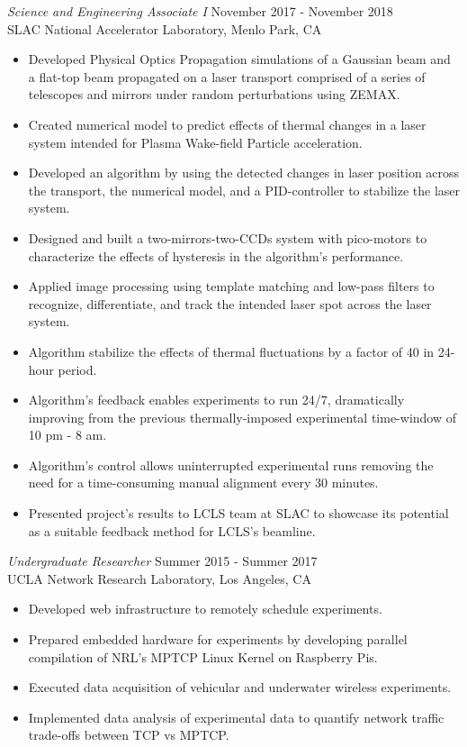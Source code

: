 \documentclass[margin,line]{res}
\begin{document}
\begin{resume}
{\sl Science and Engineering Associate I} \hfill November 2017 - November 2018 \\
				SLAC National Accelerator Laboratory, Menlo Park, CA
				\begin{itemize}
					\itemsep -2pt
					\item Developed Physical Optics Propagation simulations of a Gaussian beam and a flat-top beam propagated on a laser transport comprised of a series of telescopes and mirrors under random perturbations using ZEMAX. 
					\item Created numerical model to predict effects of thermal changes in a laser system intended for Plasma Wake-field Particle acceleration.  
					\item Developed an algorithm by using the detected changes in laser position across the transport, the numerical model, and a PID-controller to stabilize the laser system. 
					\item Designed and built a two-mirrors-two-CCDs system with pico-motors to characterize the effects of hysteresis in the algorithm's performance.
					\item Applied image processing using template matching and low-pass filters to recognize, differentiate, and track the intended laser spot across the laser system. 
					\item Algorithm stabilize the effects of thermal fluctuations by a factor of 40 in 24-hour period. 
					\item Algorithm's feedback enables experiments to run 24/7, dramatically improving from the previous thermally-imposed experimental time-window of 10 pm - 8 am.
					\item Algorithm's control allows uninterrupted experimental runs removing the need for a time-consuming manual alignment every 30 minutes. 
					\item Presented project's results to LCLS team at SLAC to showcase its potential as a suitable feedback method for LCLS's beamline.
				\end{itemize}
				
{\sl Undergraduate Researcher} \hfill Summer 2015 - Summer 2017 \\
                UCLA Network Research Laboratory, 
                Los Angeles, CA 
                 \begin{itemize}  \itemsep -2pt %
                 \item Developed web infrastructure to remotely schedule experiments.
                \item Prepared embedded hardware for experiments by developing parallel compilation of NRL's MPTCP Linux Kernel on Raspberry Pis.
                \item Executed data acquisition of vehicular and underwater wireless experiments.
                \item Implemented data analysis of experimental data to quantify network traffic trade-offs between TCP vs MPTCP.
                \end{itemize}  
                

\end{resume}
\end{document}
